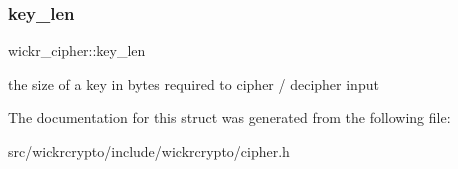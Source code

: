 \subsubsection{\texorpdfstring{key\+\_\+len}{key\_len}}
{\footnotesize\ttfamily wickr\+\_\+cipher\+::key\+\_\+len}

the size of a key in bytes required to cipher / decipher input 

The documentation for this struct was generated from the following file\+:\begin{DoxyCompactItemize}
\item 
src/wickrcrypto/include/wickrcrypto/cipher.\+h\end{DoxyCompactItemize}

